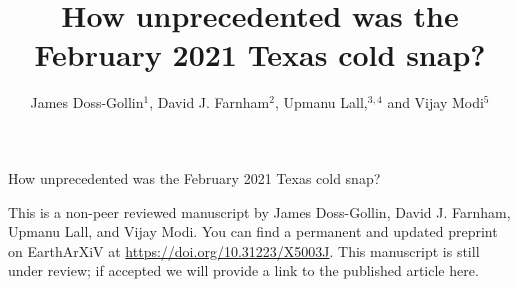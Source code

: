 \documentclass[12pt]{iopart}
\begin{document}
\vspace*{1in}

{\LARGE How unprecedented was the February 2021 Texas cold snap?}

\vspace*{1in}

This is a non-peer reviewed manuscript by James Doss-Gollin, David J. Farnham, Upmanu Lall, and Vijay Modi.
You can find a permanent and updated preprint on EarthArXiV at \url{https://doi.org/10.31223/X5003J}.
This manuscript is still under review; if accepted we will provide a link to the published article here.

\clearpage

\title[PREPRINT by Doss-Gollin, Farnham, Modi, and Lall]{How unprecedented was the February 2021 Texas cold snap?}

\author{James Doss-Gollin$^1$, David J. Farnham$^2$, Upmanu Lall,$^{3,4}$ and Vijay Modi$^5$}
\address{$^1$ Department of Civil and Environmental Engineering, Rice University, Houston, TX, USA (ORCID 0000-0002-3428-2224)}
\address{$^2$ Department of Global Ecology, Carnegie Institution for Science, Stanford, CA, USA (ORCID 0000-0002-6690-4251)}
\address{$^3$ Columbia Water Center, Columbia University, New York, NY, USA (ORCID 0000-0003-0529-8128)}
\address{$^4$ Department of Earth and Environmental Engineering, Columbia University, New York, NY, USA}
\address{$^4$ Department of Mechanical Engineering, Columbia University, New York, NY, USA (ORCID 0000-0003-2513-0437)}
\vspace{10pt}
\end{document}
